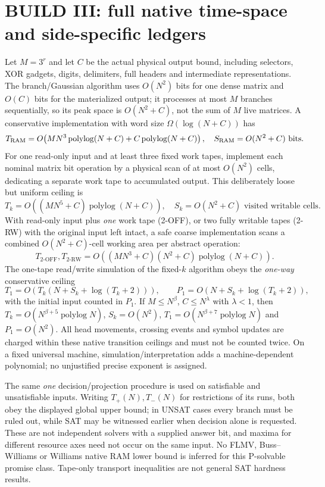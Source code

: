 \documentclass[11pt]{article}
\begin{document}
\section{BUILD III: full native time-space and side-specific ledgers}
Let $M=3^r$ and let $C$ be the actual physical output bound, including selectors, XOR gadgets, digits, delimiters, full headers and intermediate representations. The branch/Gaussian algorithm uses $O(N^2)$ bits for one dense matrix and $O(C)$ bits for the materialized output; it processes at most $M$ branches sequentially, so its peak space is $O(N^2+C)$, not the sum of $M$ live matrices. A conservative implementation with word size $\Omega(\log(N+C))$ has
\[
 T_{\rm RAM}=O\!\left(MN^3\operatorname{polylog}(N+C)+C\operatorname{polylog}(N+C)\right),\quad
 S_{\rm RAM}=O(N^2+C)\text{ bits}.
\]
For one read-only input and at least three fixed work tapes, implement each nominal matrix bit operation by a physical scan of at most $O(N^2)$ cells, dedicating a separate work tape to accumulated output. This deliberately loose but uniform ceiling is
\[
 T_k=O\!\left((MN^5+C)\operatorname{polylog}(N+C)\right),\quad
 S_k=O(N^2+C)\text{ visited writable cells}.
\]
With read-only input plus \emph{one} work tape (2-OFF), or two fully writable tapes (2-RW) with the original input left intact, a safe coarse implementation scans a combined $O(N^2+C)$-cell working area per abstract operation:
\[
 T_{2\text{-OFF}},T_{2\text{-RW}}=O\!\left((MN^3+C)(N^2+C)\operatorname{polylog}(N+C)\right).
\]
The one-tape read/write simulation of the fixed-$k$ algorithm obeys the \emph{one-way} conservative ceiling
\[
 T_1=O\left(T_k(N+S_k+\log(T_k+2))\right),\qquad
 P_1=O\left(N+S_k+\log(T_k+2)\right),
\]
with the initial input counted in $P_1$. If $M\le N^\beta$, $C\le N^\lambda$ with $\lambda<1$, then $T_k=O(N^{\beta+5}\operatorname{polylog}N)$, $S_k=O(N^2)$, $T_1=O(N^{\beta+7}\operatorname{polylog}N)$ and $P_1=O(N^2)$. All head movements, crossing events and symbol updates are charged within these native transition ceilings and must not be counted twice. On a fixed universal machine, simulation/interpretation adds a machine-dependent polynomial; no unjustified precise exponent is assigned.

The same \emph{one} decision/projection procedure is used on satisfiable and unsatisfiable inputs. Writing $T_+(N),T_-(N)$ for restrictions of its runs, both obey the displayed global upper bound; in UNSAT cases every branch must be ruled out, while SAT may be witnessed earlier when decision alone is requested. These are not independent solvers with a supplied answer bit, and maxima for different resource axes need not occur on the same input. No FLMV, Buss--Williams or Williams native RAM lower bound is inferred for this P-solvable promise class. Tape-only transport inequalities are not general SAT hardness results.
\end{document}
